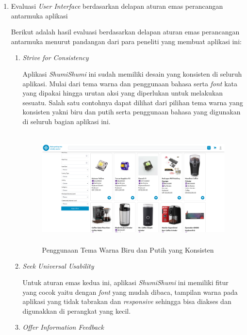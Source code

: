 \documentclass[a4paper]{article}
\begin{document}
\begin{enumerate}
    \item Evaluasi \textit{User Interface} berdasarkan delapan aturan emas perancangan antarmuka aplikasi
    
    Berikut adalah hasil evaluasi berdasarkan delapan aturan emas perancangan antarmuka menurut pandangan dari para peneliti yang membuat aplikasi ini:
    
    \begin{enumerate}
        \item \textit{Strive for Consistency}
        
        Aplikasi \textit{ShumiShumi} ini sudah memiliki desain yang konsisten di seluruh aplikasi. Mulai dari tema warna dan penggunaan bahasa serta \textit{font} kata yang dipakai hingga urutan aksi yang diperlukan untuk melakukan sesuatu. Salah satu contohnya dapat dilihat dari pilihan tema warna yang konsisten yakni biru dan putih serta penggunaan bahasa yang digunakan di seluruh bagian aplikasi ini. 

        \begin{figure}[h]
            \centering
            \includegraphics*[height=6cm]{images/prosedur pengunaan aplikasi/Search.png}
            \caption{Penggunaan Tema Warna Biru dan Putih yang Konsisten}
        \end{figure}

        \item \textit{Seek Universal Usability}
        
        Untuk aturan emas kedua ini, aplikasi \textit{ShumiShumi} ini memiliki fitur yang cocok yaitu dengan \textit{font} yang mudah dibaca, tampilan warna pada aplikasi yang tidak tabrakan dan \textit{responsive} sehingga bisa diakses dan digunakkan di perangkat yang kecil.

        \item \textit{Offer Information Feedback}
        

\end{enumerate}
\end{enumerate}
\end{document}
